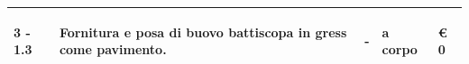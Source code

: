 \documentclass[a4paper]{article}
\begin{document}
\begin{tabular}{ | L{10mm} |  L{86mm} | L{12mm} | L{12mm} | L{16mm} | }
                            
                              \vspace{2.5mm}
                              \begin{spacing}{0}
                           3 - 1.3
                              \end{spacing} &
                              \vspace{2.5mm}
                              \begin{spacing}{0}
                           Fornitura e posa di buovo battiscopa in gress come pavimento.
                              \end{spacing} &
                              \vspace{2.5mm}
                              \begin{spacing}{0}
                           -
                              \end{spacing} &
                              \vspace{2.5mm}
                              \begin{spacing}{0}
                           a corpo
                              \end{spacing} &
                              \vspace{2.5mm}
                              \begin{spacing}{0}
                                \euro\hfill 
                            0
                              \end{spacing} \\
                              \hline


\end{tabular}
\end{document}
